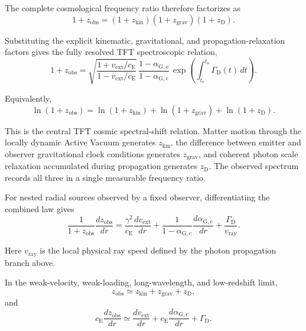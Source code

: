 The complete cosmological frequency ratio therefore factorizes as
\begin{equation}
    1+z_{\mathrm{obs}}
    =
    (1+z_{\mathrm{kin}})
    (1+z_{\mathrm{grav}})
    (1+z_{\mathrm D}).
\end{equation}

Substituting the explicit kinematic, gravitational, and propagation-relaxation factors gives the fully resolved TFT spectroscopic relation,
\begin{equation}
    1+z_{\mathrm{obs}}
    =
    \sqrt{
        \frac{
            1+v_{\mathrm{ext}}/c_{\mathrm E}
        }{
            1-v_{\mathrm{ext}}/c_{\mathrm E}
        }
    }
    \,
    \frac{
        1-\alpha_{\mathrm G,o}
    }{
        1-\alpha_{\mathrm G,e}
    }
    \,
    \exp\left(
        \int_{t_{\mathrm e}}^{t_{\mathrm o}}
        \Gamma_{\mathrm D}(t)\,dt
    \right).
\end{equation}

Equivalently,
\begin{equation}
    \ln(1+z_{\mathrm{obs}})
    =
    \ln(1+z_{\mathrm{kin}})
    +
    \ln(1+z_{\mathrm{grav}})
    +
    \ln(1+z_{\mathrm D}).
\end{equation}

This is the central TFT cosmic spectral-shift relation. Matter motion through the locally dynamic Active Vacuum generates $z_{\mathrm{kin}}$, the difference between emitter and observer gravitational clock conditions generates $z_{\mathrm{grav}}$, and coherent photon scale relaxation accumulated during propagation generates $z_{\mathrm D}$. The observed spectrum records all three in a single measurable frequency ratio.

For nested radial sources observed by a fixed observer, differentiating the combined law gives
\begin{equation}
    \frac{1}{1+z_{\mathrm{obs}}}
    \frac{dz_{\mathrm{obs}}}{dr}
    =
    \frac{\gamma^2}{c_{\mathrm E}}
    \frac{dv_{\mathrm{ext}}}{dr}
    +
    \frac{1}{1-\alpha_{\mathrm G,e}}
    \frac{d\alpha_{\mathrm G,e}}{dr}
    +
    \frac{\Gamma_{\mathrm D}}{v_{\mathrm{ray}}}.
\end{equation}

Here $v_{\mathrm{ray}}$ is the local physical ray speed defined by the photon propagation branch above.

In the weak-velocity, weak-loading, long-wavelength, and low-redshift limit,
\begin{equation}
    z_{\mathrm{obs}}
    \simeq
    z_{\mathrm{kin}}
    +
    z_{\mathrm{grav}}
    +
    z_{\mathrm D},
\end{equation}
and
\begin{equation}
    c_{\mathrm E}
    \frac{dz_{\mathrm{obs}}}{dr}
    \simeq
    \frac{dv_{\mathrm{ext}}}{dr}
    +
    c_{\mathrm E}
    \frac{d\alpha_{\mathrm G,e}}{dr}
    +
    \Gamma_{\mathrm D}.
\end{equation}

